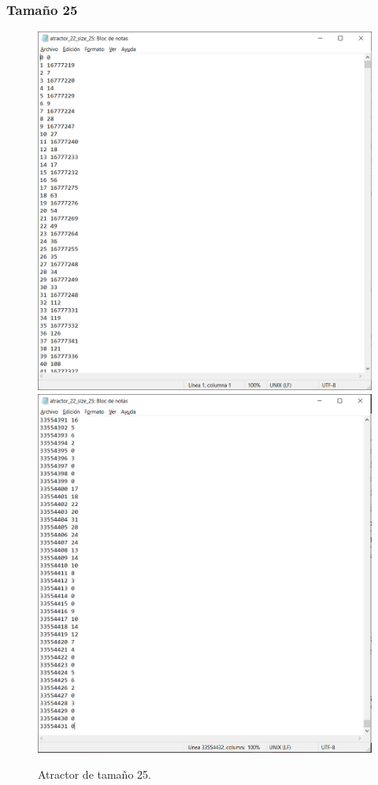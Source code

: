 \documentclass[11pt]{article}
\begin{document}
			\subsubsection{Tamaño 25}
			\begin{figure}[H]
			\centering
			\includegraphics[scale=0.3]{resources/Atractores22/atractor_22_size_25.png}
			\includegraphics[scale=0.3]{resources/Atractores22/atractor_22_size_251.png}
			\caption{Atractor de tamaño 25.}\label{fig:picture}
			\end{figure}
\end{document}
